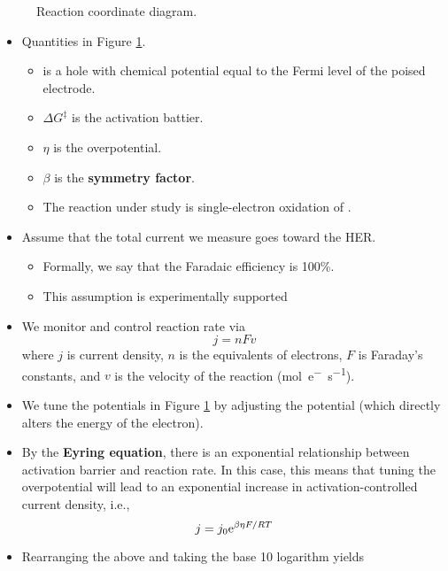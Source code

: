\documentclass[../notes.tex]{subfiles}
\begin{document}
\begin{itemize}
\begin{figure}[h!]
        \caption{Reaction coordinate diagram.}
        \label{fig:EChemRCD}
    \end{figure}
    \begin{itemize}
        \item Quantities in Figure \ref{fig:EChemRCD}.
        \begin{itemize}
            \item {} is a hole with chemical potential equal to the Fermi level of the poised electrode.
            \item $\Delta G^\ddagger$ is the activation battier.
            \item $\eta$ is the overpotential.
            \item $\beta$ is the \textbf{symmetry factor}.
            \item The reaction under study is single-electron oxidation of .
        \end{itemize}
        \item Assume that the total current we measure goes toward the HER.
        \begin{itemize}
            \item Formally, we say that the Faradaic efficiency is 100\%.
            \item This assumption is experimentally supported
        \end{itemize}
        \item We monitor and control reaction rate via
        \begin{equation*}
            j = nFv
        \end{equation*}
        where $j$ is current density, $n$ is the equivalents of electrons, $F$ is Faraday's constants, and $v$ is the velocity of the reaction (\si{mol.e^-\per\second}).
        \item We tune the potentials in Figure \ref{fig:EChemRCD} by adjusting the potential (which directly alters the energy of the electron).
        \item By the \textbf{Eyring equation}, there is an exponential relationship between activation barrier and reaction rate. In this case, this means that tuning the overpotential will lead to an exponential increase in activation-controlled current density, i.e.,
        \begin{equation*}
            j = j_0\e[\beta\eta F/RT]
        \end{equation*}
        \item Rearranging the above and taking the base 10 logarithm yields

\end{itemize}
\end{itemize}
\end{document}
